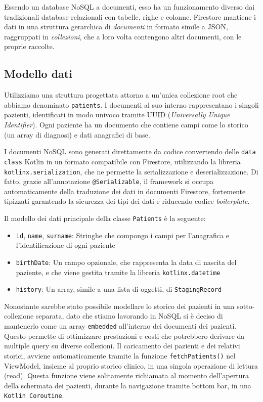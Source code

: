 Essendo un database NoSQL a documenti, esso ha un funzionamento diverso dai tradizionali database relazionali con tabelle, righe e colonne.
Firestore mantiene i dati in una struttura gerarchica di \textit{documenti} in formato simile a JSON, raggruppati in \textit{collezioni}, che a loro volta contengono
altri documenti, con le proprie raccolte.

\subsection{Modello dati}\label{subsec:modello-dati}

Utilizziamo una struttura progettata attorno a un'unica collezione root che abbiamo denominato \texttt{patients}.
I documenti al suo interno rappresentano i singoli pazienti, identificati in modo univoco tramite UUID (\textit{Universally Unique Identifier}).
Ogni paziente ha un documento che contiene campi come lo storico (un array di diagnosi) e dati anagrafici di base.

I documenti NoSQL sono generati direttamente da codice convertendo delle \texttt{data class} Kotlin in un formato compatibile con Firestore, utilizzando
la libreria \texttt{kotlinx.serialization}, che ne permette la serializzazione e deserializzazione.
Di fatto, grazie all'annotazione \texttt{@Serializable}, il framework si occupa automaticamente della traduzione dei dati in documenti Firestore,
fortemente tipizzati garantendo la sicurezza dei tipi dei dati e riducendo codice \textit{boilerplate}.

Il modello dei dati principale della classe \texttt{Patients} è la seguente:
\begin{itemize}
    \item \texttt{id}, \texttt{name}, \texttt{surname}: Stringhe che compongo i campi per l'anagrafica e l'identificazione di ogni paziente
    \item \texttt{birthDate}: Un campo opzionale, che rappresenta la data di nascita del paziente, e che viene gestita tramite la libreria \texttt{kotlinx.datetime}
    \item\texttt{history}: Un array, simile a una lista di oggetti, di \texttt{StagingRecord}
\end{itemize}

Nonostante sarebbe stato possibile modellare lo storico dei pazienti in una sotto-collezione separata, dato che stiamo lavorando
in NoSQL si è deciso di mantenerlo come un array \texttt{embedded} all'interno dei documenti dei pazienti.
Questo permette di ottimizzare prestazioni e costi che potrebbero derivare da multiple query su diverse collezioni.
Il caricamento dei pazienti e dei relativi storici, avviene automaticamente tramite la funzione \texttt{fetchPatients()} nel ViewModel,
insieme al proprio storico clinico, in una singola operazione di lettura (read).
Questa funzione viene solitamente richiamata al momento
dell'apertura della schermata dei pazienti, durante la navigazione tramite bottom bar, in una \texttt{Kotlin Coroutine}.

